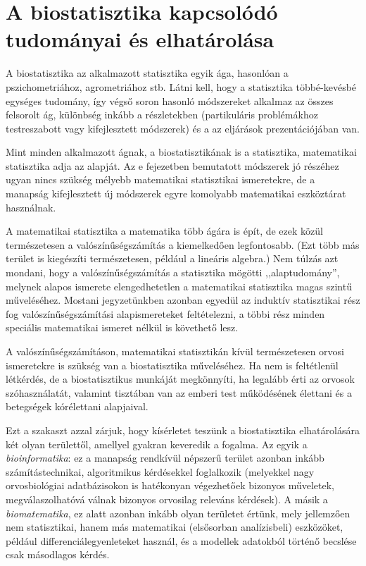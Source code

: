 \documentclass[]{book}
\begin{document}
\section{A biostatisztika kapcsolódó tudományai és
elhatárolása}\label{alapokvelhatarolas}

A biostatisztika az alkalmazott statisztika egyik ága, hasonlóan a
pszichometriához, agrometriához stb. Látni kell, hogy a statisztika
többé-kevésbé egységes tudomány, így végső soron hasonló módszereket
alkalmaz az összes felsorolt ág, különbség inkább a részletekben
(partikuláris problémákhoz testreszabott vagy kifejlesztett módszerek)
és a az eljárások prezentációjában van.

Mint minden alkalmazott ágnak, a biostatisztikának is a statisztika,
matematikai statisztika adja az alapját. Az e fejezetben bemutatott
módszerek jó részéhez ugyan nincs szükség mélyebb matematikai
statisztikai ismeretekre, de a manapság kifejlesztett új módszerek egyre
komolyabb matematikai eszköztárat használnak.

A matematikai statisztika a matematika több ágára is épít, de ezek közül
természetesen a valószínűségszámítás a kiemelkedően legfontosabb. (Ezt
több más terület is kiegészíti természetesen, például a lineáris
algebra.) Nem túlzás azt mondani, hogy a valószínűségszámítás a
statisztika mögötti ,,alaptudomány'', melynek alapos ismerete
elengedhetetlen a matematikai statisztika magas szintű műveléséhez.
Mostani jegyzetünkben azonban egyedül az induktív statisztikai rész fog
valószínűségszámítási alapismereteket feltételezni, a többi rész minden
speciális matematikai ismeret nélkül is követhető lesz.

A valószínűségszámításon, matematikai statisztikán kívül természetesen
orvosi ismeretekre is szükség van a biostatisztika műveléséhez. Ha nem
is feltétlenül létkérdés, de a biostatisztikus munkáját megkönnyíti, ha
legalább érti az orvosok szóhasználatát, valamint tisztában van az
emberi test működésének élettani és a betegségek kórélettani alapjaival.

Ezt a szakaszt azzal zárjuk, hogy kísérletet teszünk a biostatisztika
elhatárolására két olyan területtől, amellyel gyakran keveredik a
fogalma. Az egyik a \emph{bioinformatika}: ez a manapság rendkívül
népszerű terület azonban inkább számítástechnikai, algoritmikus
kérdésekkel foglalkozik (melyekkel nagy orvosbiológiai adatbázisokon is
hatékonyan végezhetőek bizonyos műveletek, megválaszolhatóvá válnak
bizonyos orvosilag releváns kérdések). A másik a \emph{biomatematika},
ez alatt azonban inkább olyan területet értünk, mely jellemzően nem
statisztikai, hanem más matematikai (elsősorban analízisbeli)
eszközöket, például differenciálegyenleteket használ, és a modellek
adatokból történő becslése csak másodlagos kérdés.
\end{document}
